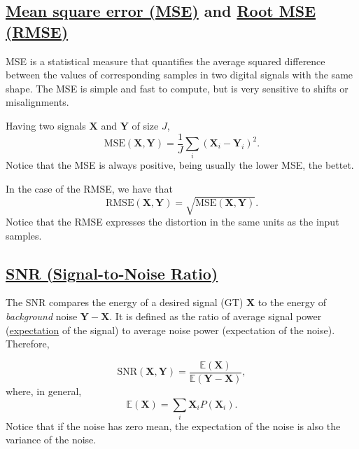 \documentclass{article}
\begin{document}
\subsection{\href{https://en.wikipedia.org/wiki/Mean_squared_error}{Mean square error (MSE)} and \href{https://en.wikipedia.org/wiki/Root_mean_square_deviation}{Root MSE (RMSE)}}

MSE is a statistical measure that quantifies the average squared
difference between the values of corresponding samples in two digital
signals with the same shape. The MSE is simple and fast to compute, but is very sensitive to shifts or misalignments.

Having two signals $\mathbf{X}$ and $\mathbf{Y}$ of size $J$,
\begin{equation}
  \text{MSE}(\mathbf{X},\mathbf{Y}) = \frac{1}{J}\sum_i(\mathbf{X}_i - \mathbf{Y}_i)^2.
  \label{eq:MSE}
\end{equation}
Notice that the MSE is always positive, being usually the lower MSE, the bettet.

In the case of the RMSE, we have that
\begin{equation}
  \text{RMSE}(\mathbf{X},\mathbf{Y}) = \sqrt{\text{MSE}(\mathbf{X},\mathbf{Y})}.
  \label{eq:RMSE}
\end{equation}
Notice that the RMSE expresses the distortion in the same units as the
input samples.

\subsection{\href{https://en.wikipedia.org/wiki/Signal-to-noise_ratio}{SNR (Signal-to-Noise Ratio)}}

The SNR compares the energy of a desired signal (GT) $\mathbf{X}$ to
the energy of \emph{background} noise $\mathbf{Y}-\mathbf{X}$. It is
defined as the ratio of average signal power
(\href{https://en.wikipedia.org/wiki/Expected_value}{expectation} of
the signal) to average noise power (expectation of the
noise). Therefore,

\begin{equation}
  \text{SNR}(\mathbf{X},\mathbf{Y}) = \frac{\mathbb{E}(\mathbf{X})}{\mathbb{E}(\mathbf{Y} - \mathbf{X})},
  \label{eq:formal_SNR}
\end{equation}
where, in general, 
\begin{equation}
  \mathbb{E}(\mathbf{X}) = \sum_{i}\mathbf{X}_iP(\mathbf{X}_i).
  \label{eq:expectation}
\end{equation}
Notice that if the noise has zero mean, the expectation
of the noise is also the variance of the noise.
\end{document}
